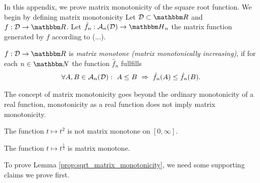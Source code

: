 In this appendix, we prove matrix monotonicity of the square root function. We begin by defining matrix monotonicity 
Let $\cD \subset \bbmR$ and $f: \cD \rightarrow \bbmR$. Let $\hat{f}_n: \cA_n(\cD) \rightarrow \bbmH_n$ 
the matrix function generated by $f$ according to (...). 
\begin{definition}  
$f: \cD \rightarrow \bbmR$ is \emph{matrix monotone (matrix monotonically increasing)}, if for each $n \in \bbmN$ the function $\hat{f}_n$ 
fullfills 
\begin{align*}
\forall A,B \in {\mathcal A}_n({\mathcal D}): \ A \leq B \ \Rightarrow \ \hat{f}_n(A) \leq \hat{f}_n(B).
\end{align*}
\end{definition}
The concept of matrix monotonicity goes beyond the ordinary monotonicity of a real function, monotonicity as a real function does not imply matrix monotonicity. 
\begin{example}
 The function $t \mapsto t^2$ is not matrix monotone on $[0,\infty]$. 
\end{example}
\begin{lemma} \label{prop:sqrt_matrix_monotonicity}
The function $t \mapsto t^{\tfrac{1}{2}}$ is matrix monotone.
\end{lemma}	
To prove Lemma \ref{prop:sqrt_matrix_monotonicity}, we need some supporting claims we prove first. 

